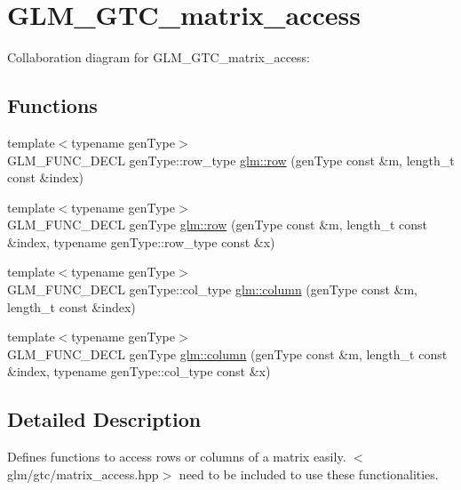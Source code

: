 \hypertarget{group__gtc__matrix__access}{
\section{GLM\_\-GTC\_\-matrix\_\-access}
\label{group__gtc__matrix__access}
}


Collaboration diagram for GLM\_\-GTC\_\-matrix\_\-access:\subsection*{Functions}
\begin{CompactItemize}
\item 
{\footnotesize template$<$typename genType$>$ }\\GLM\_\-FUNC\_\-DECL genType::row\_\-type \hyperlink{group__gtc__matrix__access_g46e78366e4057c64e554cc442e407cca}{glm::row} (genType const \&m, length\_\-t const \&index)
\item 
{\footnotesize template$<$typename genType$>$ }\\GLM\_\-FUNC\_\-DECL genType \hyperlink{group__gtc__matrix__access_g4409b9c0604f3ed3e6f116b6680eae44}{glm::row} (genType const \&m, length\_\-t const \&index, typename genType::row\_\-type const \&x)
\item 
{\footnotesize template$<$typename genType$>$ }\\GLM\_\-FUNC\_\-DECL genType::col\_\-type \hyperlink{group__gtc__matrix__access_g8cd6c920268e4e2eb90ed2b30665d9e5}{glm::column} (genType const \&m, length\_\-t const \&index)
\item 
{\footnotesize template$<$typename genType$>$ }\\GLM\_\-FUNC\_\-DECL genType \hyperlink{group__gtc__matrix__access_gea14296c0a9299135e7c7c03826c2604}{glm::column} (genType const \&m, length\_\-t const \&index, typename genType::col\_\-type const \&x)
\end{CompactItemize}


\subsection{Detailed Description}
Defines functions to access rows or columns of a matrix easily. $<$glm/gtc/matrix\_\-access.hpp$>$ need to be included to use these functionalities. 

